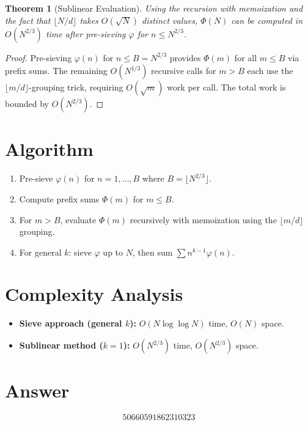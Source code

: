 \documentclass[11pt]{article}
\newtheorem{theorem}{Theorem}
\begin{document}
\begin{theorem}[Sublinear Evaluation]
Using the recursion with memoization and the fact that $\lfloor N/d \rfloor$ takes $O(\sqrt{N})$ distinct values, $\Phi(N)$ can be computed in $O(N^{2/3})$ time after pre-sieving $\varphi$ for $n \leq N^{2/3}$.
\end{theorem}

\begin{proof}
Pre-sieving $\varphi(n)$ for $n \leq B = N^{2/3}$ provides $\Phi(m)$ for all $m \leq B$ via prefix sums. The remaining $O(N^{1/3})$ recursive calls for $m > B$ each use the $\lfloor m/d \rfloor$-grouping trick, requiring $O(\sqrt{m})$ work per call. The total work is bounded by $O(N^{2/3})$.
\end{proof}

\section{Algorithm}

\begin{enumerate}
    \item Pre-sieve $\varphi(n)$ for $n = 1, \ldots, B$ where $B = \lfloor N^{2/3} \rfloor$.
    \item Compute prefix sums $\Phi(m)$ for $m \leq B$.
    \item For $m > B$, evaluate $\Phi(m)$ recursively with memoization using the $\lfloor m/d \rfloor$ grouping.
    \item For general $k$: sieve $\varphi$ up to $N$, then sum $\sum n^{k-1}\varphi(n)$.
\end{enumerate}

\section{Complexity Analysis}

\begin{itemize}
    \item \textbf{Sieve approach (general $k$):} $O(N \log\log N)$ time, $O(N)$ space.
    \item \textbf{Sublinear method ($k = 1$):} $O(N^{2/3})$ time, $O(N^{2/3})$ space.
\end{itemize}

\section{Answer}

\[
\boxed{50660591862310323}
\]
\end{document}
